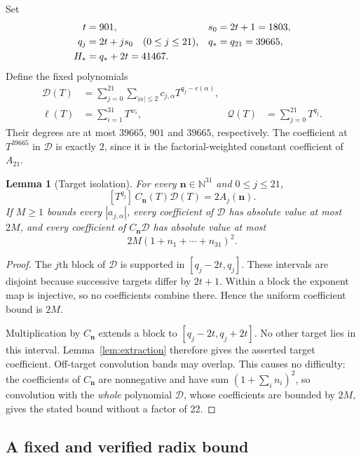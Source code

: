 \documentclass[11pt,letterpaper]{article}
\newtheorem{lemma}[theorem]{Lemma}
\theoremstyle{definition}\newtheorem{definition}[theorem]{Definition}
\theoremstyle{remark}\newtheorem{remark}[theorem]{Remark}
\newcommand{\N}{\mathbb N}
\newcommand{\cD}{\mathcal D}
\newcommand{\cQ}{\mathcal Q}
\begin{document}
Set
\begin{align}
 t&=901,&s_0&=2t+1=1803,\notag\\
 q_j&=2t+js_0\quad(0\le j\le21),&q_*&=q_{21}=39665,\notag\\
 H_*&=q_*+2t=41467.\label{eq:targets}
\end{align}
Define the fixed polynomials
\begin{align}
 \cD(T)&=\sum_{j=0}^{21}\sum_{|\alpha|\le2}
               c_{j,\alpha}T^{q_j-e(\alpha)},\label{eq:Dcode}\\
 \ell(T)&=\sum_{i=1}^{31}T^{w_i},&
 \cQ(T)&=\sum_{j=0}^{21}T^{q_j}.\label{eq:maskpolys}
\end{align}
Their degrees are at most $39665$, $901$ and $39665$, respectively. The coefficient at $T^{39665}$ in $\cD$ is exactly $2$, since it is the factorial-weighted constant coefficient of $A_{21}$.

\begin{lemma}[Target isolation]\label{lem:targets}
For every $\mathbf n\in\N^{31}$ and $0\le j\le21$,
\[
 [T^{q_j}]\,C_{\mathbf n}(T)\cD(T)=2A_j(\mathbf n).
\]
If $M\ge1$ bounds every $|a_{j,\alpha}|$, every coefficient of $\cD$ has absolute value at most $2M$, and every coefficient of $C_{\mathbf n}\cD$ has absolute value at most
\[
 2M(1+n_1+\cdots+n_{31})^2.
\]
\end{lemma}
\begin{proof}
The $j$th block of $\cD$ is supported in $[q_j-2t,q_j]$. These intervals are disjoint because successive targets differ by $2t+1$. Within a block the exponent map is injective, so no coefficients combine there. Hence the uniform coefficient bound is $2M$.

Multiplication by $C_{\mathbf n}$ extends a block to $[q_j-2t,q_j+2t]$. No other target lies in this interval. Lemma~\ref{lem:extraction} therefore gives the asserted target coefficient. Off-target convolution bands may overlap. This causes no difficulty: the coefficients of $C_{\mathbf n}$ are nonnegative and have sum $(1+\sum_i n_i)^2$, so convolution with the \emph{whole} polynomial $\cD$, whose coefficients are bounded by $2M$, gives the stated bound without a factor of 22.
\end{proof}

\subsection{A fixed and verified radix bound}
\end{document}
